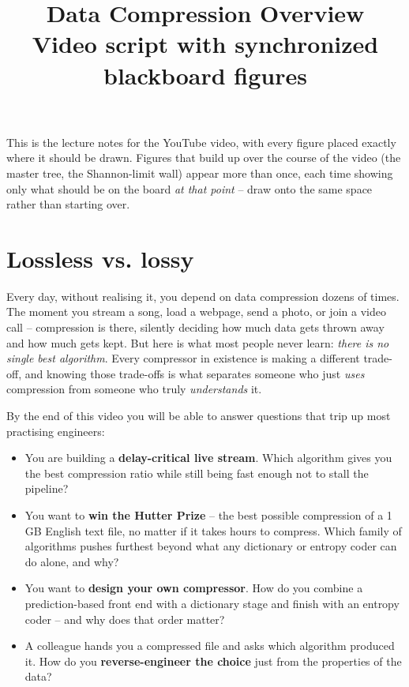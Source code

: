 \documentclass[11pt]{article}
\title{\Large\bfseries Data Compression Overview\\[4pt]
\large\normalfont Video script with synchronized blackboard figures}
\author{}
\date{}
\begin{document}
\maketitle
\vspace{-2em}

\noindent This is the lecture notes for the YouTube video, with every figure placed exactly
where it should be drawn. Figures that build up over the course of the video
(the master tree, the Shannon-limit wall) appear more than once, each time
showing only what should be on the board \emph{at that point} -- draw onto the
same space rather than starting over.

\section{Lossless vs. lossy}
\label{sec:lossless-lossy}

Every day, without realising it, you depend on data compression dozens of
times. The moment you stream a song, load a webpage, send a photo, or
join a video call -- compression is there, silently deciding how much data
gets thrown away and how much gets kept. But here is what most people
never learn: \emph{there is no single best algorithm}. Every compressor
in existence is making a different trade-off, and knowing those
trade-offs is what separates someone who just \emph{uses} compression
from someone who truly \emph{understands} it.

By the end of this video you will be able to answer questions that
trip up most practising engineers:

\begin{itemize}
\item You are building a \textbf{delay-critical live stream}. Which
  algorithm gives you the best compression ratio while still being fast
  enough not to stall the pipeline?
\item You want to \textbf{win the Hutter Prize} -- the best possible
  compression of a 1\,GB English text file, no matter if it takes hours
  to compress. Which family of algorithms pushes furthest beyond what
  any dictionary or entropy coder can do alone, and why?
\item You want to \textbf{design your own compressor}. How do you combine
  a prediction-based front end with a dictionary stage and finish with an
  entropy coder -- and why does that order matter?
\item A colleague hands you a compressed file and asks which algorithm
  produced it. How do you \textbf{reverse-engineer the choice} just from
  the properties of the data?
\end{itemize}
\end{document}
